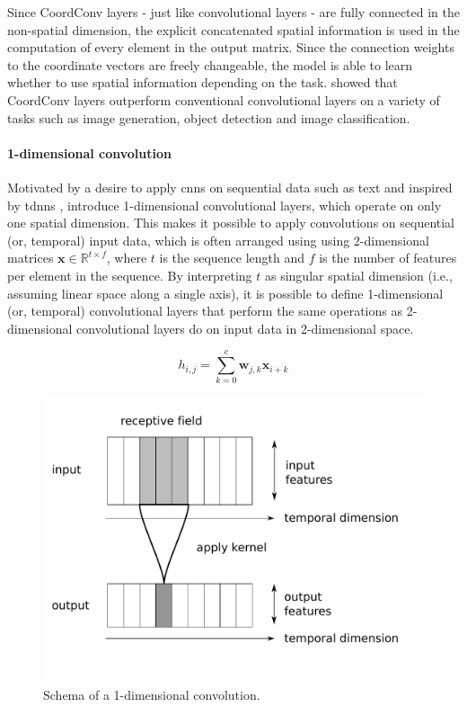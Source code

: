 Since CoordConv layers - just like convolutional layers - are fully connected in the non-spatial dimension, the explicit concatenated spatial information is used in the computation of every element in the output matrix. Since the connection weights to the coordinate vectors are freely changeable, the model is able to learn whether to use spatial information depending on the task. \citet{DBLP:conf/nips/LiuLMSFSY18} showed that CoordConv layers outperform conventional convolutional layers on a variety of tasks such as image generation, object detection and image classification.

\paragraph{1-dimensional convolution}

Motivated by a desire to apply \glspl{cnn} on sequential data such as text and inspired by \glspl{tdnn} \citep{DBLP:conf/interspeech/BottouFBL89}, \citet{DBLP:journals/jmlr/CollobertWBKKK11} introduce 1-dimensional convolutional layers, which operate on only one spatial dimension. This makes it possible to apply convolutions on sequential (or, temporal) input data, which is often arranged using using 2-dimensional matrices $\mathbf{x}\in\mathbb{R}^{t\times f}$, where $t$ is the sequence length and $f$ is the number of features per element in the sequence. By interpreting $t$ as singular spatial dimension (i.e., assuming linear space along a single axis), it is possible to define 1-dimensional (or, temporal) convolutional layers that perform the same operations as 2-dimensional convolutional layers do on input data in 2-dimensional space.

\begin{equation}
\label{eq:conv1d}
    h_{i,j}=\sum_{k=0}^c \mathbf{w}_{j,k}\mathbf{x}_{i+k}
\end{equation}
\begin{figure}
    \centering
    \includegraphics[width=\textwidth]{graphics/conv1d.pdf}
    \caption{Schema of a 1-dimensional convolution.}
    \label{fig:conv1d}
\end{figure}


